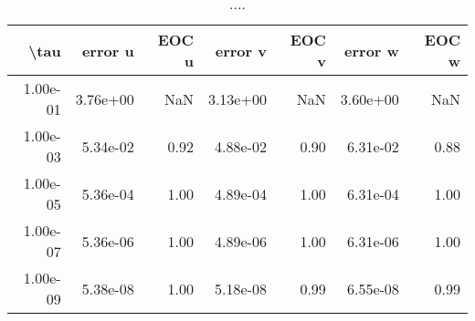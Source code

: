 \begin{table}[ht]
\centering
\begin{tabular}{rrrrrrr}
  \hline
  \textbf{\textbackslash{}tau} & \textbf{error u} & \textbf{EOC u} & \textbf{error v} & \textbf{EOC v} & \textbf{error w} & \textbf{EOC w} \\\hline
  1.00e-01 & 3.76e+00 & NaN & 3.13e+00 & NaN & 3.60e+00 & NaN \\
  1.00e-03 & 5.34e-02 & 0.92 & 4.88e-02 & 0.90 & 6.31e-02 & 0.88 \\
  1.00e-05 & 5.36e-04 & 1.00 & 4.89e-04 & 1.00 & 6.31e-04 & 1.00 \\
  1.00e-07 & 5.36e-06 & 1.00 & 4.89e-06 & 1.00 & 6.31e-06 & 1.00 \\
  1.00e-09 & 5.38e-08 & 1.00 & 5.18e-08 & 0.99 & 6.55e-08 & 0.99 \\\hline
\end{tabular}
\caption{....}
\end{table}
